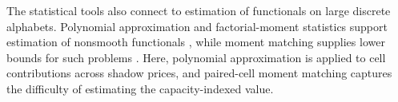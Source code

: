 The statistical tools also connect to estimation of functionals on large discrete alphabets. Polynomial approximation and factorial-moment statistics support estimation of nonsmooth functionals \citep{JiaoVenkatHanWeissman2015}, while moment matching supplies lower bounds for such problems \citep{CaiLow2011,JiaoHanWeissman2018}. Here, polynomial approximation is applied to cell contributions across shadow prices, and paired-cell moment matching captures the difficulty of estimating the capacity-indexed value.
